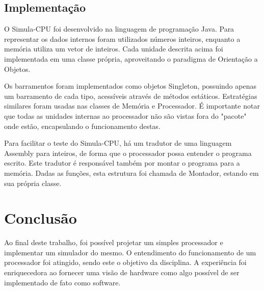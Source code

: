 \documentclass[
	12pt,				%
	oneside,			%
	a4paper,			%
	english,			%
	french,				%
	spanish,			%
	brazil,				%
	]{abntex2}
\begin{document}
{\section{Implementação}
O Simula-CPU foi desenvolvido na linguagem de programação Java. Para
representar os dados internos foram utilizados números inteiros, enquanto
a memória utiliza um vetor de inteiros. Cada unidade descrita acima foi
implementada em uma classe própria, aproveitando o paradigma de Orientação a
Objetos.

Os barramentos foram implementados como objetos Singleton, possuindo apenas um
barramento de cada tipo, acessíveis através de métodos estáticos. Estratégias
similares foram usadas nas classes de Memória e Processador. É importante notar
que todas as unidades internas ao processador não são vistas fora do "pacote"~
onde estão, encapsulando o funcionamento destas.

Para facilitar o teste do Simula-CPU, há um tradutor de uma linguagem Assembly
para inteiros, de forma que o processador possa entender o programa escrito.
Este tradutor é responsável também por montar o programa para a memória. Dadas
as funções, esta estrutura foi chamada de Montador, estando em sua própria
classe.





%

\chapter*[Conclusão]{Conclusão}
Ao final deste trabalho, foi possível projetar um simples processador e
implementar um simulador do mesmo. O entendimento do funcionamento de um
processador foi atingido, sendo este o objetivo da disciplina. A experiência
foi enriquecedora ao fornecer uma visão de hardware como algo possível de ser
implementado de fato como software.

\postextual



}
\end{document}
